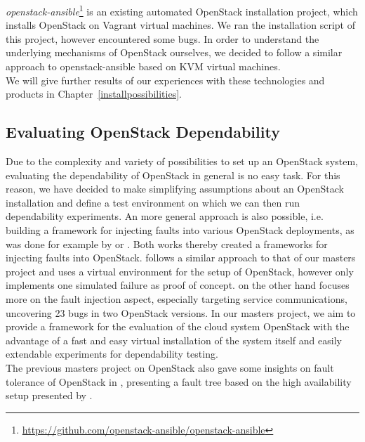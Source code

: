 \emph{openstack-ansible}\footnote{\url{https://github.com/openstack-ansible/openstack-ansible}} is an existing automated OpenStack installation project, which installs OpenStack on Vagrant virtual machines. We ran the installation script of this project, however encountered some bugs. In order to understand the underlying mechanisms of OpenStack ourselves, we decided to follow a similar approach to openstack-ansible based on KVM virtual machines.\\

We will give further results of our experiences with these technologies and products in Chapter~\ref{installpossibilities}.

\subsection{Evaluating OpenStack Dependability}

Due to the complexity and variety of possibilities to set up an OpenStack system, evaluating the dependability of OpenStack in general is no easy task. For this reason, we have decided to make simplifying assumptions about an OpenStack installation and define a test environment on which we can then run dependability experiments. An more general approach is also possible, i.e. building a framework for injecting faults into various OpenStack deployments, as was done for example by \cite{kollarova} or \cite{Ju:2013:FRO:2523616.2523622}. Both works thereby created a frameworks for injecting faults into OpenStack. \cite{kollarova} follows a similar approach to that of our masters project and uses a virtual environment for the setup of OpenStack, however only implements one simulated failure as proof of concept. \cite{Ju:2013:FRO:2523616.2523622} on the other hand focuses more on the fault injection aspect, especially targeting service communications, uncovering 23 bugs in two OpenStack versions. In our masters project, we aim to provide a framework for the evaluation of the cloud system OpenStack with the advantage of a fast and easy virtual installation of the system itself and easily extendable experiments for dependability testing.\\

The previous masters project on OpenStack also gave some insights on fault tolerance of OpenStack in \cite{mp14}, presenting a fault tree based on the high availability setup presented by \cite{teng}.








